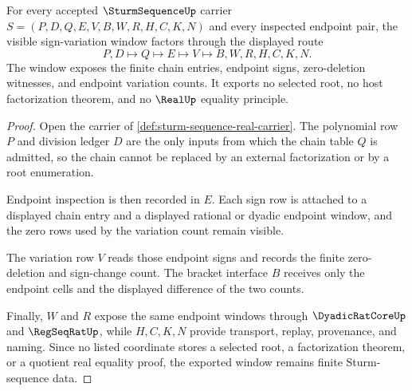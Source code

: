 \begin{theorem}
\label{thm:sturm-sequence-sign-variation-window}
For every accepted $\SturmSequenceUp$ carrier $S=(P,D,Q,E,V,B,W,R,H,C,K,N)$ and every inspected endpoint pair, the visible sign-variation window factors through the displayed route
$$
P,D \longmapsto Q \longmapsto E \longmapsto V \longmapsto B,W,R,H,C,K,N .
$$
The window exposes the finite chain entries, endpoint signs, zero-deletion witnesses, and endpoint variation counts. It exports no selected root, no host factorization theorem, and no $\RealUp$ equality principle.
\end{theorem}
\begin{proof}
Open the carrier of \autoref{def:sturm-sequence-real-carrier}. The polynomial row $P$ and division ledger $D$ are the only inputs from which the chain table $Q$ is admitted, so the chain cannot be replaced by an external factorization or by a root enumeration.

Endpoint inspection is then recorded in $E$. Each sign row is attached to a displayed chain entry and a displayed rational or dyadic endpoint window, and the zero rows used by the variation count remain visible.

The variation row $V$ reads those endpoint signs and records the finite zero-deletion and sign-change count. The bracket interface $B$ receives only the endpoint cells and the displayed difference of the two counts.

Finally, $W$ and $R$ expose the same endpoint windows through $\DyadicRatCoreUp$ and $\RegSeqRatUp$, while $H,C,K,N$ provide transport, replay, provenance, and naming. Since no listed coordinate stores a selected root, a factorization theorem, or a quotient real equality proof, the exported window remains finite Sturm-sequence data.
\end{proof}


